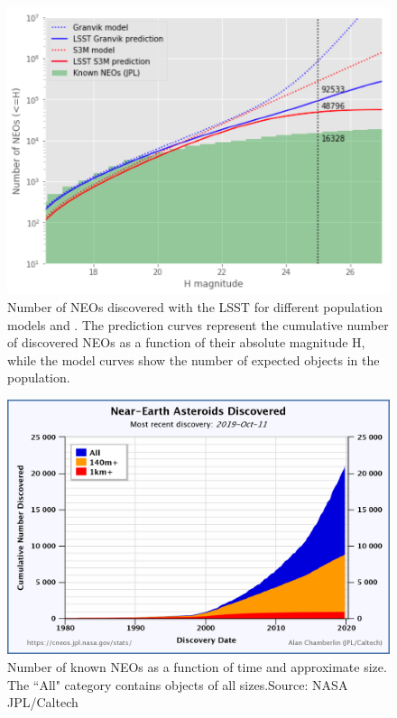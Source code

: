 \begin{figure}[tb!]
\begin{center}
\includegraphics[width=0.65\linewidth]{figs/neo1.png}
\end{center}
\caption{Number of NEOs discovered with the \gls{LSST} for different population models \citep[S3M,][]{s3m} and \citet{granvik2018neos}.
The prediction curves represent the cumulative number of discovered NEOs as a function of their absolute magnitude H, while the model curves show the number of expected objects in the population.}
\label{fig:neo_count}       %
\end{figure}

\begin{figure}[tb!]
\begin{center}
\includegraphics[width=0.65\linewidth]{figs/nea_vs_time_chart.png}
\end{center}
\caption{Number of known NEOs as a function of time and approximate size. The ``All" category contains objects of all sizes.\gls{Source}: \gls{NASA} \gls{JPL}/Caltech}
\label{fig:neo_current}       %
\end{figure}

\clearpage


